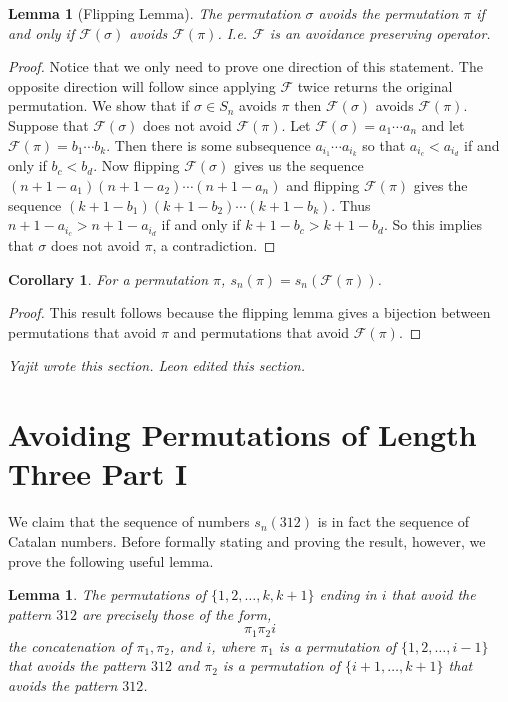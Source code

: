 \documentclass[11pt,letterpaper,twoside,english]{article}
\theoremstyle{theorem}
\newtheorem{corollary}[theorem]{Corollary}
\newtheorem{lemma}[theorem]{Lemma}
\theoremstyle{remark}
\begin{document}
\begin{lemma}[Flipping Lemma]
The permutation $\sigma$ avoids the permutation $\pi$ if and only if $\mathcal{F}(\sigma)$ avoids $\mathcal{F}(\pi)$. I.e. $\mathcal{F}$ is an avoidance preserving operator. 
\end{lemma}
\begin{proof}
Notice that we only need to prove one direction of this statement. The opposite direction will follow since applying $\mathcal{F}$ twice returns the original permutation. We show that if ${\sigma}\in S_n$ avoids $\pi$ then $\mathcal{F}(\sigma)$ avoids $\mathcal{F}(\pi)$. Suppose that $\mathcal{F}(\sigma)$ does not avoid $\mathcal{F}(\pi)$. Let $\mathcal{F}(\sigma)=a_1\cdots a_n$ and let $\mathcal{F}(\pi)=b_1\cdots  b_k$. Then there is some subsequence $a_{i_1}\cdots a_{i_k}$ so that $a_{i_c}<a_{i_d}$ if and only if $b_c<b_d$. Now flipping $\mathcal{F}(\sigma)$ gives us the sequence $(n+1-a_1)(n+1-a_2)\cdots(n+1-a_n)$ and flipping $\mathcal{F}(\pi)$ gives the sequence $(k+1-b_1)(k+1-b_2)\cdots(k+1-b_k)$. Thus $n+1-a_{i_c}>n+1-a_{i_d}$ if and only if $k+1-b_c>k+1-b_d$. So  this implies that $\sigma$ does not avoid $\pi$, a contradiction. 
\end{proof}

\begin{corollary} 
For a permutation $\pi$, $s_n(\pi)=s_n(\mathcal{F}(\pi))$. 
\end{corollary}
\begin{proof}
This result follows because the flipping lemma gives a bijection between permutations that avoid $\pi$ and permutations that avoid $\mathcal{F}(\pi)$. 
\end{proof}

\emph{Yajit wrote this section. Leon edited this section.}


\section{Avoiding Permutations of Length Three Part I}
\label{312}

We claim that the sequence of numbers $s_n(312)$ is in fact the sequence of Catalan numbers. Before formally stating and proving the result, however, we prove the following useful lemma.
\begin{lemma}
\label{lemma1}
The permutations of $\{1,2,\dots,k,k+1\}$ ending in $i$ that avoid the pattern $312$ are precisely those of the form,
$$\pi_1 \pi_2 i$$
the concatenation of $\pi_1, \pi_2$, and $i$, where $\pi_1$ is a permutation of $\{1,2,\ldots,i-1\}$ that avoids the pattern $312$ and $\pi_2$ is a permutation of $\{i+1,\ldots,k+1\}$ that avoids the pattern $312$.
\end{lemma}
\end{document}
